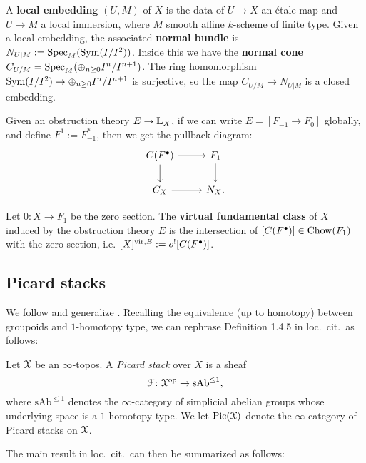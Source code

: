 \begin{defin}
A \textbf{local embedding} $(U,M)$ of $X$ is the data of $U\to X$ an \'etale map and $U\to M$ a local immersion, 
where $M$ smooth affine $k$-scheme of finite type.
Given a local embedding, the associated \textbf{normal bundle} is $N_{U|M} := \operatorname{Spec}_M(\operatorname{Sym} (I/I^2))$. Inside this 
we have the \textbf{normal cone} $C_{U/M} = \operatorname{Spec}_M(\oplus_{n\geq 0} I^n/I^{n+1})$.
The ring homomorphism $\operatorname{Sym} (I/I^2) \to \oplus_{n\geq 0} I^n/I^{n+1}$ is surjective, so the map
$C_{U/M}	\to N_{U|M}$ is a closed embedding.
\end{defin}

Given an obstruction theory $E \to \mathbb L_X$, if we can write $E = [F_{-1} \to F_0]$ globally, and define $F^1 := F_{-1}^*$, 
then we get the pullback diagram:
\[
\begin{tikzcd}
C(F^{\bullet})\arrow{r}\arrow{d} & F_1\arrow{d} \\ C_X \arrow{r} & N_X .
\end{tikzcd}
\]

\begin{defin}
Let $0: X \to F_1$ be the zero section.
The \textbf{virtual fundamental class} of $X$ induced by the obstruction theory $E$ is the intersection of
$[C(F^{\bullet})] \in \operatorname{Chow}(F_1)$ with the zero section, i.e. $[X]^{\operatorname{vir}, E} := o^{!}[C(F^{\bullet})]$.
\end{defin}

\subsection{Picard stacks}

We follow and generalize \cite[Expos\'e XVIII, \S 1.4]{SGA4}.
Recalling the equivalence (up to homotopy) between groupoids and $1$-homotopy type, we can rephrase Definition 1.4.5 in loc.\ cit.\ as follows:

\begin{defin}
	Let $\mathcal X$ be an $\infty$-topos.
	A \emph{Picard stack} over $X$ is a sheaf
	\[ \mathcal F \colon \mathcal X^{\mathrm{op}} \to \mathrm{sAb}^{\le 1} , \]
	where $\mathrm{sAb}^{\le 1}$ denotes the $\infty$-category of simplicial abelian groups whose underlying space is a $1$-homotopy type.
	We let $\mathrm{Pic}(\mathcal X)$ denote the $\infty$-category of Picard stacks on $\mathcal X$.
\end{defin}

The main result in loc.\ cit.\ can then be summarized as follows:

